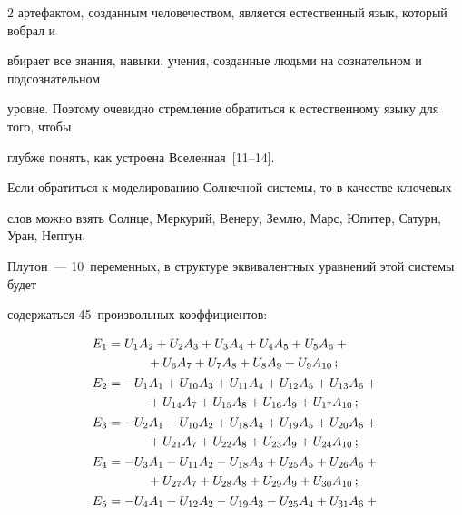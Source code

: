 \begin{multicols}{2}
артефактом, созданным человечеством, является естественный язык, который вобрал и 


вбирает все знания, навыки, учения, созданные людьми на сознательном и подсознательном 


уровне. Поэтому очевидно стремление обратиться к естественному языку для того, чтобы 


глубже понять, как устроена Вселенная~[11--14].


      


      Если обратиться к моделированию Солнечной сис\-те\-мы, то в качестве ключевых 


слов можно взять Солнце, Меркурий, Венеру, Землю, Марс, Юпитер, Сатурн, Уран, Нептун, 


Плутон~--- 10~переменных, в структуре эквивалентных уравнений этой сис\-те\-мы будет 


содержаться 45~произвольных коэффици\-ентов:


      \begin{align*}


      E_1 


&=U_1A_2+U_2A_3+U_3A_4+U_4A_5+U_5A_6+{}\\


&\hspace*{11mm}{}+U_6A_7+U_7A_8+U_8A_9+U_9A_{10}\,;\\[1pt]


     E_2 &= -U_1A_1 +U_{10}A_3 +U_{11}A_4+U_{12}A_5+U_{13}A_6+{}\\


&\hspace*{11mm}{}+U_{14}A_7+U_{15}A_8+U_{16}A_9+U _{17}A_{10}\,;\\[1pt]


     E_3 &=-U_2A_1-U_{10}A_2+U_{18}A_4+U_{19}A_5+U_{20}A_6+{}\\


     &\hspace*{11mm}{}+U_{21}A_7+U_{22}A_8+      U_{23}A_9 +U_{24}A_{10}\,;\\[1pt]


     E_4 &= -U_3A_1-U_{11}A_2-U_{18}A_3 +U_{25}A_5+U_{26}A_6+{}\\


&\hspace*{11mm}{}+U_{27}A_7+U_{28}A_8+U_{29}A_9+U_{30}A_{10}\,;\\[1pt]


     E_5&=-U_4A_1-U_{12}A_2-U_{19}A_3- U_{25}A_4+U_{31}A_6+{}\\



\end{align*}
\end{multicols}
